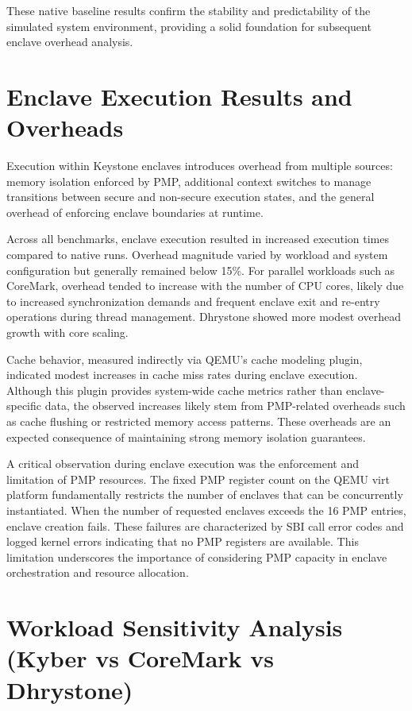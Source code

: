 These native baseline results confirm the stability and predictability of the simulated system environment, providing a solid foundation for subsequent enclave overhead analysis.

\section{Enclave Execution Results and Overheads}

Execution within Keystone enclaves introduces overhead from multiple sources: memory isolation enforced by PMP, additional context switches to manage transitions between secure and non-secure execution states, and the general overhead of enforcing enclave boundaries at runtime.

Across all benchmarks, enclave execution resulted in increased execution times compared to native runs. Overhead magnitude varied by workload and system configuration but generally remained below 15\%. For parallel workloads such as CoreMark, overhead tended to increase with the number of CPU cores, likely due to increased synchronization demands and frequent enclave exit and re-entry operations during thread management. Dhrystone showed more modest overhead growth with core scaling.

Cache behavior, measured indirectly via QEMU’s cache modeling plugin, indicated modest increases in cache miss rates during enclave execution. Although this plugin provides system-wide cache metrics rather than enclave-specific data, the observed increases likely stem from PMP-related overheads such as cache flushing or restricted memory access patterns. These overheads are an expected consequence of maintaining strong memory isolation guarantees.

A critical observation during enclave execution was the enforcement and limitation of PMP resources. The fixed PMP register count on the QEMU virt platform fundamentally restricts the number of enclaves that can be concurrently instantiated. When the number of requested enclaves exceeds the 16 PMP entries, enclave creation fails. These failures are characterized by SBI call error codes and logged kernel errors indicating that no PMP registers are available. This limitation underscores the importance of considering PMP capacity in enclave orchestration and resource allocation.

\section{Workload Sensitivity Analysis (Kyber vs CoreMark vs Dhrystone)}

